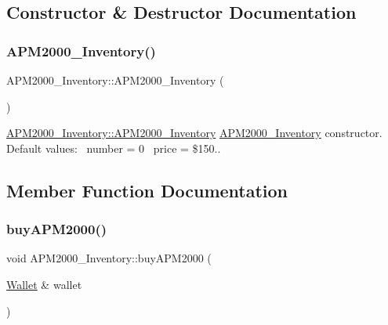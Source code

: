 \subsection{Constructor \& Destructor Documentation}
\mbox{\label{classAPM2000__Inventory_a0aa6a0abe496ccd0ee773c4a3ce38a2c}} 
\subsubsection{\texorpdfstring{A\+P\+M2000\+\_\+\+Inventory()}{APM2000\_Inventory()}}
{\footnotesize\ttfamily A\+P\+M2000\+\_\+\+Inventory\+::\+A\+P\+M2000\+\_\+\+Inventory (\begin{DoxyParamCaption}{ }\end{DoxyParamCaption})}



\hyperlink{classAPM2000__Inventory_a0aa6a0abe496ccd0ee773c4a3ce38a2c}{A\+P\+M2000\+\_\+\+Inventory\+::\+A\+P\+M2000\+\_\+\+Inventory} \hyperlink{classAPM2000__Inventory}{A\+P\+M2000\+\_\+\+Inventory} constructor.~\newline
Default values\+:~\newline
number = 0~\newline
price = \$150.. 



\subsection{Member Function Documentation}
\mbox{\label{classAPM2000__Inventory_a5f89890fced248efa0792e0ac062e9e2}} 
\subsubsection{\texorpdfstring{buy\+A\+P\+M2000()}{buyAPM2000()}}
{\footnotesize\ttfamily void A\+P\+M2000\+\_\+\+Inventory\+::buy\+A\+P\+M2000 (\begin{DoxyParamCaption}\item[{\hyperlink{classWallet}{Wallet} \&}]{wallet }\end{DoxyParamCaption})}



